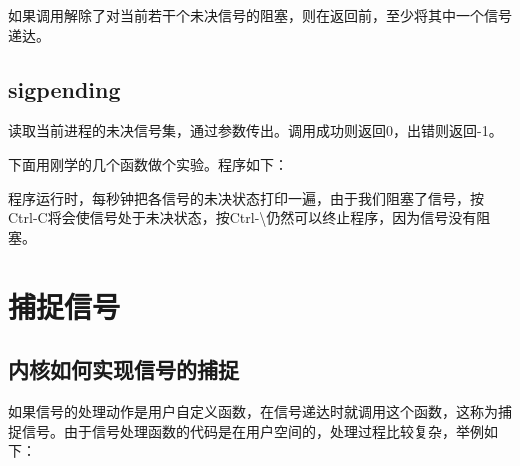 如果调用解除了对当前若干个未决信号的阻塞，则在返回前，至少将其中一个信号递达。


\subsection{sigpending}
%



读取当前进程的未决信号集，通过参数传出。调用成功则返回0，出错则返回-1。



下面用刚学的几个函数做个实验。程序如下：




程序运行时，每秒钟把各信号的未决状态打印一遍，由于我们阻塞了信号，按Ctrl-C将会使信号处于未决状态，按Ctrl-\textbackslash{}仍然可以终止程序，因为信号没有阻塞。






\section{捕捉信号}
%
\subsection{内核如何实现信号的捕捉}
%


如果信号的处理动作是用户自定义函数，在信号递达时就调用这个函数，这称为捕捉信号。由于信号处理函数的代码是在用户空间的，处理过程比较复杂，举例如下：


